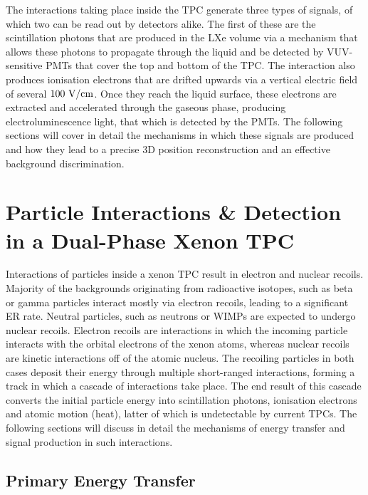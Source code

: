 %

The interactions taking place inside the TPC generate three types of signals, of which two can be read out by detectors alike. The first of these are the scintillation photons that are produced in the LXe volume via a mechanism that allows these photons to propagate through the liquid and be detected by VUV-sensitive PMTs that cover the top and bottom of the TPC. The interaction also produces ionisation electrons that are drifted upwards via a vertical electric field of several $100 \text{ V/cm}$. Once they reach the liquid surface, these electrons are extracted and accelerated through the gaseous phase, producing electroluminescence light, that which is detected by the PMTs. The following sections will cover in detail the mechanisms in which these signals are produced and how they lead to a precise 3D position reconstruction and an effective background discrimination. 


\section{Particle Interactions \& Detection in a Dual-Phase Xenon TPC}
\label{sec:xenonphysics}

Interactions of particles inside a xenon TPC result in electron and nuclear recoils. Majority of the backgrounds originating from radioactive isotopes, such as beta or gamma particles interact mostly via electron recoils, leading to a significant ER rate. Neutral particles, such as neutrons or WIMPs are expected to undergo nuclear recoils. Electron recoils are interactions in which the incoming particle interacts with the orbital electrons of the xenon atoms, whereas nuclear recoils are kinetic interactions off of the atomic nucleus. The recoiling particles in both cases deposit their energy through multiple short-ranged interactions, forming a track in which a cascade of interactions take place. The end result of this cascade converts the initial particle energy into scintillation photons, ionisation electrons and atomic motion (heat), latter of which is undetectable by current TPCs. The following sections will discuss in detail the mechanisms of energy transfer and signal production in such interactions.

\subsection{Primary Energy Transfer}
\label{sec:energy_transfer}

